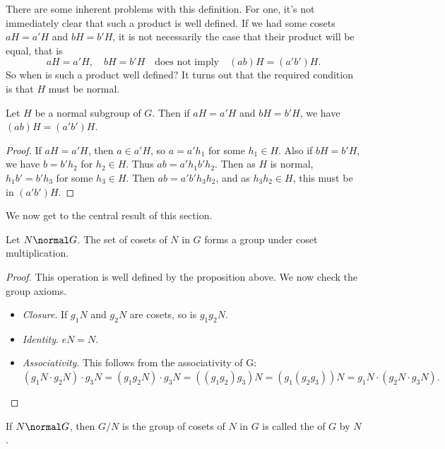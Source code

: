 \documentclass[a4paper]{scrartcl}
\begin{document}
There are some inherent problems with this definition. For one, it's not immediately clear that such a product is well defined.
If we had some cosets $aH = a'H$ and $bH = b'H$, it is not necessarily the case that their product will be equal, that is
$$
aH = a'H, \quad bH = b'H \quad \text{does not imply} \quad (ab)H = (a'b')H.
$$
So when is such a product well defined? It turns out that the required condition is that $H$ must be normal.

\begin{proposition}
	Let $H$ be a normal subgroup of $G$. Then if $aH = a'H$ and $bH = b'H$, we have $(ab)H = (a'b')H$.
\end{proposition}
\begin{proof}
	If $aH = a'H$, then $a \in a'H$, so $a = a' h_1$ for some $h_1 \in H$. Also if $bH = b'H$, we have $b = b' h_2$ for $h_2 \in H$. Thus
	$ab = a' h_1 b' h_2 $. Then as $H$ is normal,  $h_1 b' = b' h_3$ for some $h_3 \in H$. Then
	$ab = a' b' h_3 h_2$, and as $h_3 h_2 \in H$, this must be in $(a'b')H$.
\end{proof}

We now get to the central result of this section.

\begin{proposition}
	Let $N \normal G$. The set of cosets of $N$ in $G$ forms a group under coset multiplication.
\end{proposition}
\begin{proof}
	This operation is well defined by the proposition above. We now check the group axioms.
	\begin{itemize}
		\item \emph{Closure}. If $g_1N$ and $g_2 N$ are cosets, so is $g_1 g_2 N$.
		\item \emph{Identity}. $eN = N$.
		\item \emph{Associativity}. This follows from the associativity of G:
		$
		(g_1 N \cdot g_2 N) \cdot g_3 N = (g_1 g_2 N) \cdot g_3 N = ((g_1 g_2) g_3) N = (g_1 (g_2 g_3))N = g_1 N \cdot (g_2 N \cdot g_3 N).
		$
 	\end{itemize}
\end{proof}

\begin{definition}
	If $N \normal G$, then $G/N$ is the group of cosets of $N$ in $G$ is called the  of $G$ by $N$.
\end{definition}
\end{document}
